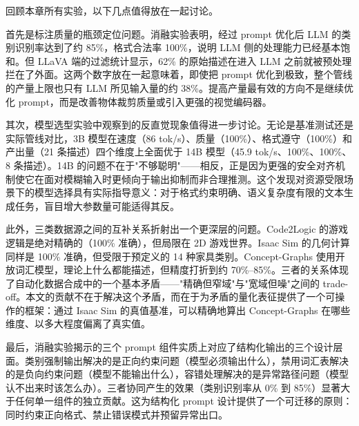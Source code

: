 回顾本章所有实验，以下几点值得放在一起讨论。

首先是标注质量的瓶颈定位问题。消融实验表明，经过 prompt 优化后 LLM 的类别识别率达到了约 85\%，格式合法率 100\%，说明 LLM 侧的处理能力已经基本饱和。但 LLaVA 端的过滤统计显示，62\% 的原始描述在进入 LLM 之前就被预处理拦在了外面。这两个数字放在一起意味着，即使把 prompt 优化到极致，整个管线的产量上限也只有 LLM 所见输入量的约 38\%。提高产量最有效的方向不是继续优化 prompt，而是改善物体裁剪质量或引入更强的视觉编码器。

其次，模型选型实验中观察到的反直觉现象值得进一步讨论。无论是基准测试还是实际管线对比，3B 模型在速度（86 tok/s）、质量（100\%）、格式遵守（100\%）和产出量（21 条描述）四个维度上全面优于 14B 模型（45.9 tok/s、100\%、100\%、8 条描述）。14B 的问题不在于"不够聪明"——相反，正是因为更强的安全对齐机制使它在面对模糊输入时更倾向于输出抑制而非合理推测。这个发现对资源受限场景下的模型选择具有实际指导意义：对于格式约束明确、语义复杂度有限的文本生成任务，盲目增大参数量可能适得其反。

此外，三类数据源之间的互补关系折射出一个更深层的问题。Code2Logic 的游戏逻辑是绝对精确的（100\% 准确），但局限在 2D 游戏世界。Isaac Sim 的几何计算同样是 100\% 准确，但受限于预定义的 14 种家具类别。Concept-Graphs 使用开放词汇模型，理论上什么都能描述，但精度打折到约 70\%--85\%。三者的关系体现了自动化数据合成中的一个基本矛盾——"精确但窄域"与"宽域但噪"之间的 trade-off。本文的贡献不在于解决这个矛盾，而在于为矛盾的量化表征提供了一个可操作的框架：通过 Isaac Sim 的真值基准，可以精确地算出 Concept-Graphs 在哪些维度、以多大程度偏离了真实值。

最后，消融实验揭示的三个 prompt 组件实质上对应了结构化输出的三个设计层面。类别强制输出解决的是正向约束问题（模型必须输出什么），禁用词汇表解决的是负向约束问题（模型不能输出什么），容错处理解决的是异常路径问题（模型认不出来时该怎么办）。三者协同产生的效果（类别识别率从 0\% 到 85\%）显著大于任何单一组件的独立贡献。这为结构化 prompt 设计提供了一个可迁移的原则：同时约束正向格式、禁止错误模式并预留异常出口。
